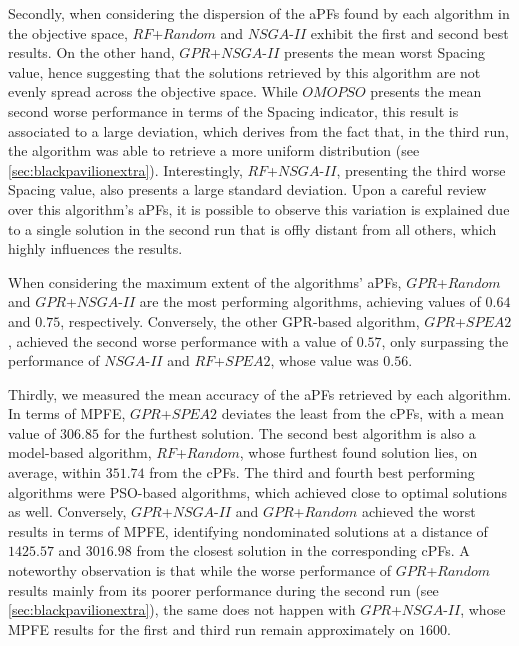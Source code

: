 Secondly, when considering the dispersion of the \acp{aPF} found by each algorithm in the objective space, $RF$+$Random$ and $NSGA$-$II$ exhibit the first and second best results. On the other hand, $GPR$+$NSGA$-$II$ presents the mean worst Spacing value, hence suggesting that the solutions retrieved by this algorithm are not evenly spread across the objective space. While $OMOPSO$ presents the mean second worse performance in terms of the Spacing indicator, this result is associated to a large deviation, which derives from the fact that, in the third run, the algorithm was able to retrieve a more uniform distribution (see \cref{sec:blackpavilionextra}). Interestingly, $RF$+$NSGA$-$II$, presenting the third worse Spacing value, also presents a large standard deviation. Upon a careful review over this algorithm's \acp{aPF}, it is possible to observe this variation is explained due to a single solution in the second run that is offly distant from all others, which highly influences the results. 

When considering the maximum extent of the algorithms' \acp{aPF}, $GPR$+$Random$ and $GPR$+$NSGA$-$II$ are the most performing algorithms, achieving values of $0.64$ and $0.75$, respectively. Conversely, the other \ac{GPR}-based algorithm, $GPR$+$SPEA2$, achieved the second worse performance with a value of $0.57$, only surpassing the performance of $NSGA$-$II$ and $RF$+$SPEA2$, whose value was $0.56$. 

Thirdly, we measured the mean accuracy of the \acp{aPF} retrieved by each algorithm. In terms of \ac{MPFE}, $GPR$+$SPEA2$ deviates the least from the \acp{cPF}, with a mean value of $306.85$ for the furthest solution. The second best algorithm is also a model-based algorithm, $RF$+$Random$, whose furthest found solution lies, on average, within $351.74$ from the \acp{cPF}. The third and fourth best performing algorithms were \ac{PSO}-based algorithms, which achieved close to optimal solutions as well. Conversely, $GPR$+$NSGA$-$II$ and $GPR$+$Random$ achieved the worst results in terms of \ac{MPFE}, identifying nondominated solutions at a distance of $1425.57$ and $3016.98$ from the closest solution in the corresponding \acp{cPF}. A noteworthy observation is that while the worse performance of $GPR$+$Random$ results mainly from its poorer performance during the second run (see \cref{sec:blackpavilionextra}), the same does not happen with $GPR$+$NSGA$-$II$, whose \ac{MPFE} results for the first and third run remain approximately on $1600$. 

